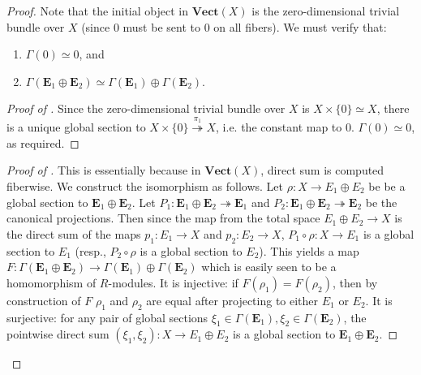 \documentclass[11pt]{article}
\theoremstyle{plain}
\theoremstyle{definition}
\begin{document}
\begin{proof}
  Note that the initial object in \(\mathbf{Vect}(X)\) is the zero-dimensional trivial bundle over \(X\) (since \(0\) must be sent to \(0\) on all fibers). We must verify that:
  \begin{enumerate}

  \item \label{global-sections-preserves-zero} \(\Gamma(0) \simeq 0\), and
  \item \label{global-sections-preserves-direct-sum} \(\Gamma(\mathbf{E}_1 \oplus \mathbf{E}_2) \simeq \Gamma(\mathbf{E}_1) \oplus \Gamma(\mathbf{E}_2)\).
  \end{enumerate}

  \begin{proof}[Proof of ]
    Since the zero-dimensional trivial bundle over \(X\) is \(X \times \{0\} \simeq X\), there is a unique global section to \(X \times \{0\} \overset{\pi_1}{\twoheadrightarrow} X\), i.e. the constant map to \(0\). \(\Gamma(0) \simeq 0\), as required.
  \end{proof}

  \begin{proof}[Proof of ]
    This is essentially because in \(\mathbf{Vect}(X)\), direct sum is computed fiberwise. We construct the isomorphism as follows. Let \(\rho : X \to E_1 \oplus E_2\) be be a global section to \(\mathbf{E}_1 \oplus \mathbf{E}_2\). Let \(P_1 : \mathbf{E}_1 \oplus \mathbf{E}_2 \twoheadrightarrow \mathbf{E}_1\) and \(P_2 : \mathbf{E}_1 \oplus \mathbf{E}_2 \twoheadrightarrow \mathbf{E}_2\) be the canonical projections. Then since the map from the total space \(E_1 \oplus E_2 \to X\) is the direct sum of the maps \(p_1 : E_1 \to X\) and \(p_2 : E_2 \to X\), \(P_1 \circ \rho : X \to E_1\) is a global section to \(E_1\) (resp., \(P_2 \circ \rho\) is a global section to \(E_2\)). This yields a map \(F : \Gamma(\mathbf{E}_1 \oplus \mathbf{E}_2) \to \Gamma(\mathbf{E}_1) \oplus \Gamma(\mathbf{E}_2)\) which is easily seen to be a homomorphism of \(R\)-modules. It is injective: if \(F(\rho_1) = F(\rho_2)\), then by construction of \(F\) \(\rho_1\) and \(\rho_2\) are equal after projecting to either \(E_1\) or \(E_2\). It is surjective: for any pair of global sections \(\xi_1 \in \Gamma(\mathbf{E}_1), \xi_2 \in \Gamma(\mathbf{E}_2)\), the pointwise direct sum \((\xi_1, \xi_2) : X \to E_1 \oplus E_2\) is a global section to \(\mathbf{E}_1 \oplus \mathbf{E}_2\).

  \end{proof}
\end{proof}
\end{document}
